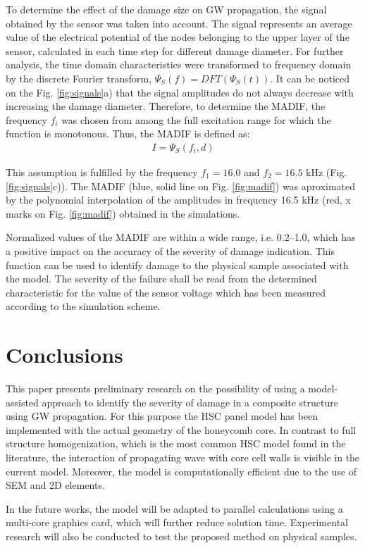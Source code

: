 \documentclass[materials,article,submit,moreauthors,pdftex]{Definitions/mdpi}
\begin{document}
To determine the effect of the damage size on GW propagation, the signal obtained by the sensor was taken into account.
The signal represents an average value of the electrical potential of the nodes belonging to the upper layer of the sensor, calculated in each time step for different damage diameter.
For further analysis, the time domain characteristics were transformed to frequency domain by the discrete Fourier transform, \(\Psi_S(f)=DFT(\Psi_S(t))\).
It can be noticed on the Fig. \ref{fig:signals}a) that the signal amplitudes do not always decrease with increasing the damage diameter.
Therefore, to determine the MADIF, the frequency \(f_i\) was chosen from among the full excitation range for which the function is monotonous. Thus, the MADIF is defined as:
\begin{eqnarray}
I = \Psi_S(f_i,d)
\end{eqnarray}

This assumption is fulfilled by the frequency \(f_1=16.0\) and \(f_2=16.5\) kHz (Fig. \ref{fig:signals}c)).
The MADIF (blue, solid line on Fig. \ref{fig:madif}) was aproximated by the polynomial interpolation of the amplitudes in frequency 16.5 kHz (red, x marks on Fig. \ref{fig:madif}) obtained in the simulations. 

Normalized values of the MADIF are within a wide range, i.e. 0.2–1.0, which has a positive impact on the accuracy of the severity of damage indication.
This function can be used to identify damage to the physical sample associated with the model.
The severity of the failure shall be read from the determined characteristic for the value of the sensor voltage which has been measured according to the simulation scheme.

\section{Conclusions}
\label{sec:conc}
This paper presents preliminary research on the possibility of using a model-assisted approach to identify the severity of damage in a composite structure using GW propagation.
For this purpose the HSC panel model has been implemented with the actual geometry of the honeycomb core.
In contrast to  full structure homogenization, which is the most common HSC model found in the literature, the interaction of propagating wave with core cell walls is visible in the current model.
Moreover, the model is computationally efficient due to the use of SEM and 2D elements.

In the future works, the model will be adapted to parallel calculations using a multi-core graphics card, which will further reduce solution time. Experimental research will also be conducted to test the proposed method on physical samples.
\end{document}
